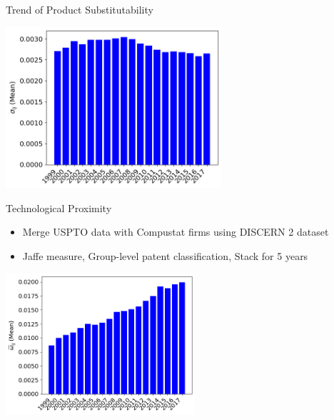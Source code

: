 \documentclass[
  10pt, %
  aspectratio=169,  %
  handout
]{beamer}
\theoremstyle{plain}
\begin{document}
\begin{frame}{Trend of Product Substitutability}
  \begin{center}
    \includegraphics[width=8cm]{figures/sigma}
  \par\end{center}

\end{frame}

\begin{frame}{Technological Proximity }
  \begin{itemize}
    \item Merge USPTO data with Compustat firms using DISCERN 2 dataset \citep{Arora2024-ad}
    \item Jaffe measure, Group-level patent classification, Stack for 5 years
  \end{itemize}
  \begin{center}
    \includegraphics[width=7cm]{figures/omega}
    \par\end{center}
\end{frame}
\end{document}
